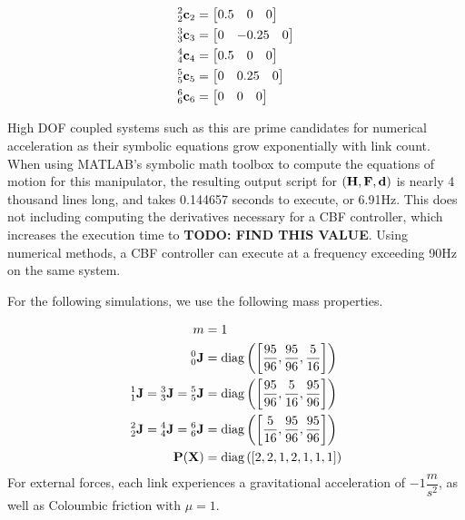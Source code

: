 \begin{align*}
\begin{split}
        {^2_2 \mathbf{c}_2} &= \begin{bmatrix} 0.5& 0& 0 \end{bmatrix}\\
        {^3_3 \mathbf{c} _3} &= \begin{bmatrix} 0& -0.25& 0\end{bmatrix}\\
        {^4_4 \mathbf{c} _4} &= \begin{bmatrix} 0.5& 0& 0 \end{bmatrix}\\
        {^5_5 \mathbf{c} _5} &= \begin{bmatrix} 0 & 0.25 & 0\end{bmatrix}\\
        {^6_6 \mathbf{c} _6} &= \begin{bmatrix} 0 & 0 & 0\end{bmatrix}\\
    \end{split}
\end{align*}

\noindent High DOF coupled systems such as this are prime candidates for numerical acceleration as their symbolic equations grow exponentially with link count. When using MATLAB's symbolic math toolbox to compute the equations of motion for this manipulator, the resulting output script for $({\mathbf{H}}, {\mathbf{F}}, {\mathbf{d}})$ is nearly 4 thousand lines long, and takes 0.144657 seconds to execute, or 6.91Hz. This does not including computing the derivatives necessary for a CBF controller, which increases the execution time to \textbf{TODO: FIND THIS VALUE}. Using numerical methods, a CBF controller can execute at a frequency exceeding 90Hz on the same system. \newline

\noindent For the following simulations, we use the following mass properties.

\begin{align*}
    m &= 1\\
    {^0_0}\mathbf{J} &=  \text{diag}\left (\left [\dfrac{95}{96}, \dfrac{95}{96},  \dfrac{5}{16} \right ] \right )\\
    {^1_1}\mathbf{J} = {^3_3}\mathbf{J} = {^5_5}\mathbf{J} &=  \text{diag}\left (\left [ \dfrac{95}{96}, \dfrac{5}{16}, \dfrac{95}{96} \right ]\right ) \\
    {^2_2}\mathbf{J} = {^4_4}\mathbf{J} = {^6_6}\mathbf{J} &=  \text{diag}\left (\left [ \dfrac{5}{16}, \dfrac{95}{96}, \dfrac{95}{96} \right ]\right ) \\
    \mathbf{P}(\mathbf{X}) &= \text{diag} \left (\left [2, 2, 1, 2, 1, 1, 1 \right] \right )
\end{align*}
\noindent For external forces,  each link experiences a gravitational acceleration of $-1 \dfrac{m}{s^2}$, as well as Coloumbic friction with $\mu = 1$. \newline

